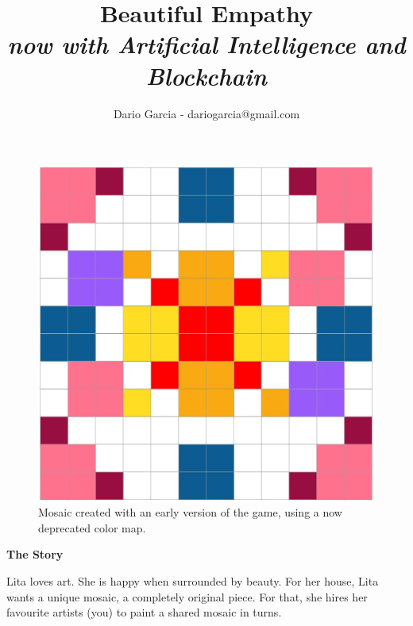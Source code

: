 \documentclass[twocolumn]{article}
\title{Beautiful Empathy\\
\textit{now with Artificial Intelligence and Blockchain}}
\author{Dario Garcia - dariogarcia@gmail.com}
\newcommand{\lvl}[1]{\vspace{0.5cm}\Large{\textbf{#1}}\vspace{0.2cm}}
\begin{document}
\maketitle

\lvl{}
\vspace{-1cm}




\begin{figure}[h!]
\centering
\includegraphics[scale=0.22]{First_ever.jpg}
\caption{Mosaic created with an early version of the game, using a now deprecated color map.}
\label{fig:mosaic}
\end{figure}


\null
\vspace{1cm}
\lvl{The Story}

Lita loves art. She is happy when surrounded by beauty. For her house, Lita wants a unique mosaic, a completely original piece. For that, she hires her favourite artists (you) to paint a shared mosaic in turns.
\end{document}
